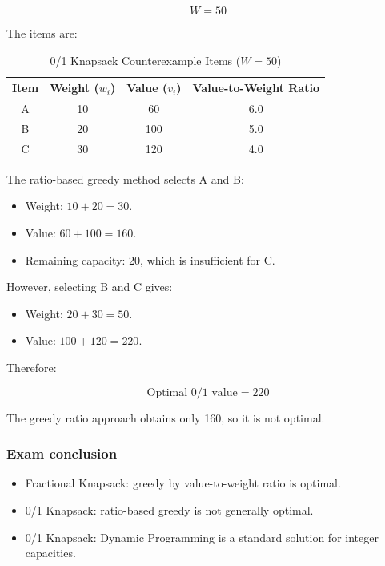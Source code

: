 \[
W=50
\]


The items are:

\begin{table}[htbp]
\centering
\caption{0/1 Knapsack Counterexample Items ($W = 50$)}
\label{tab:knapsack_counterexample}
\begin{tabular}{cccc}
\toprule
\textbf{Item} & \textbf{Weight ($w_i$)} & \textbf{Value ($v_i$)} & \textbf{Value-to-Weight Ratio} \\
\midrule
A & 10 & 60 & 6.0 \\
B & 20 & 100 & 5.0 \\
C & 30 & 120 & 4.0 \\
\bottomrule
\end{tabular}
\end{table}

The ratio-based greedy method selects A and B:

\begin{itemize}
    \item Weight: $10+20=30$.
    \item Value: $60+100=160$.
    \item Remaining capacity: 20, which is insufficient for C.
\end{itemize}

However, selecting B and C gives:

\begin{itemize}
    \item Weight: $20+30=50$.
    \item Value: $100+120=220$.
\end{itemize}

Therefore:


\[
\boxed{\text{Optimal 0/1 value}=220}
\]


The greedy ratio approach obtains only 160, so it is not optimal.

\subsubsection{Exam conclusion}

\begin{itemize}
    \item Fractional Knapsack: greedy by value-to-weight ratio is optimal.
    \item 0/1 Knapsack: ratio-based greedy is not generally optimal.
    \item 0/1 Knapsack: Dynamic Programming is a standard solution for integer capacities.
\end{itemize}

